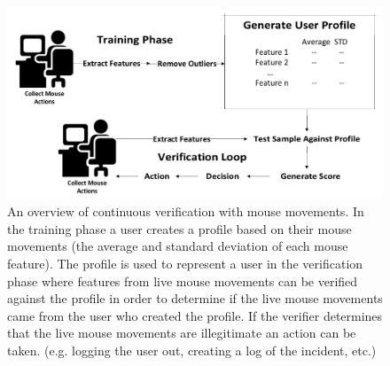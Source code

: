 \documentclass[conference]{IEEEtran}
\begin{document}
\begin{figure}
  \includegraphics[width=1\linewidth]{Overview.pdf}
\caption{An overview of continuous verification with mouse movements. In the training phase a user creates a profile based on their mouse movements (the average and standard deviation of each mouse feature). The profile is used to represent a user in the verification phase where features from live mouse movements can be verified against the profile in order to determine if the live mouse movements came from the user who created the profile. If the verifier determines that the live mouse movements are illegitimate an action can be taken. (e.g. logging the user out, creating a log of the incident, etc.)}
\label{fig:process}
\end{figure}


\bgroup
\end{document}
